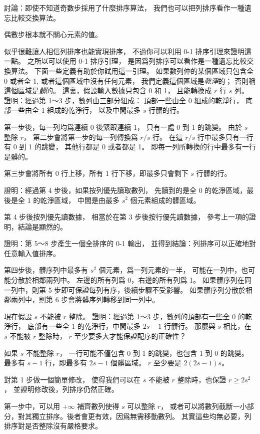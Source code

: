 \startigBase[a,continue]\startitem
討論：即使不知道奇數步採用了什麼排序算法，
我們也可以把列排序看作一種遺忘比較交換算法。
\stopitem\stopigBase

\startANSWER
偶數步根本就不關心元素的值。
\stopANSWER

似乎很難讓人相信列排序也能實現排序，
不過你可以利用 0-1 排序引理來證明這一點。
之所以可以使用 0-1 排序引理，
是因爲列排序可以看作是一種遺忘比較交換算法。
下面一些定義有助於你試用這一引理。
如果數列仲的某個區域只包含全 0 或者全 1,
或者這個區域中沒有任何元素，
我們定義這個區域是\emph{乾淨}的；
否則稱這個區域是\emph{髒}的。
這裏，假設輸入數據只包含 0 和 1，
且能轉換成 $r$ 行 $s$ 列。
\startigBase[continue]\startitem
證明：經過第 1～3 步，數列由三部分組成：
頂部一些由全 $0$ 組成的乾淨行，
底部一些由全 1 組成的乾淨行，
以及中間最多 $s$ 行髒的行。
\stopitem\stopigBase

\startANSWER
第一步後，每一列均爲連續 0 後緊跟連續 1，
只有一處 0 到 1 的跳變。
由於 $s$ 整除 $r$，
第二步會將第一步的每一列轉換爲 $r/s$ 行。
在這 $r/s$ 行中最多只有一行有 0 到 1 的跳變，
其他行都是 0 或者都是 1。
即每一列所轉換的行中最多有一行是髒的。

第三步會將所有 0 行上移，所有 1 行下移，即最多只會剩下 $s$ 行髒的行。
\stopANSWER

\startigBase[continue]\startitem
證明：經過第 4 步後，如果按列優先讀取數列，
先讀到的是全 0 的乾淨區域，最後是全 1 的乾淨區域，
中間是由最多 $s^2$ 個元素組成的髒區域。
\stopitem\stopigBase

\startANSWER
第 4 步後按列優先讀數據，
相當於在第 3 步後按行優先讀數據，
參考上一項的證明，結論是顯然的。
\stopANSWER

\startigBase[continue]\startitem
證明：第 5～8 步產生一個全排序的 0-1 輸出，
並得到結論：列排序可以正確地對任意輸入值排序。
\stopitem\stopigBase

\startANSWER
第四步後，髒序列中最多有 $s^2$ 個元素，爲一列元素的一半，
可能在一列中，也可能分散於相鄰兩列中。
左邊的所有列爲 0，右邊的所有列爲 1。
如果髒序列在同一列中，則第 5 步即可保證每列有序，後續步驟不受影響。
如果髒序列分散於相鄰兩列中，則第 6 步會將髒序列轉移到同一列中。
\stopANSWER

\startigBase[continue]\startitem
現在假設 $s$ 不能被 $r$ 整除。
證明：經過第 1～3 步，數列的頂部有一些全 0 的乾淨行，
底部有一些全 1 的乾淨行，中間最多 $2s-1$ 行髒行。
那麼與 $s$ 相比，在 $s$ 不能被 $r$ 整除時，
 $r$ 至少要多大才能保證配序的正確性？
\stopitem\stopigBase

\startANSWER
如果 $s$ 不能整除 $r$，
一行可能不僅包含 0 到 1 的跳變，也包含 1 到 0 的跳變。
最多有 $s - 1$  行，即最多有 $2s-1$ 個髒區域。
 $r$ 至少要是 $2(2s-1)s$。
\stopANSWER

\startigBase[continue]\startitem
對第 1 步做一個簡單修改，
使得我們可以在 $s$ 不能被 $r$ 整除時，也保證 $r\ge 2s^2$，
並證明修改後，列排序仍然正確。
\stopitem\stopigBase

\startANSWER
第一步中，可以用 $+\infty$ 補齊數列使得 $s$ 可以整除 $r$，
或者可以將數列截斷一小部分，對其獨立排序。後者會更有效，因爲無需移動數列。
其實這些均無必要，列排序對是否整除沒有嚴格要求。
\stopANSWER

\stopPROBLEM
